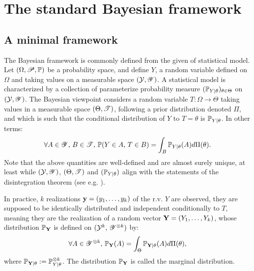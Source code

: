 


\section{The standard Bayesian framework}

\subsection{A minimal framework}

The Bayesian framework is commonly defined from the given of statistical model.
Let $(\Omega,\mathscr{P},\mathbb{P})$ be a probability space, and define $Y$, a random variable defined on $\Omega$ and taking values on a measurable space $(\mathcal{Y},\mathscr{Y})$.
A statistical model is characterized by a collection of parameterize probability measure $(\mathbb{P}_{Y|\theta})_{\theta\in\Theta}$ on $(\mathcal{Y},\mathscr{Y})$.
The Bayesian viewpoint considers a random variable $T:\Omega\to\Theta$ taking values in a measurable space $(\Theta,\mathscr{T})$, following a prior distribution denoted $\Pi$, and which is such that the conditional distribution of $Y$ to $T=\theta$ is $\mathbb{P}_{Y|\theta}$. In other terms:
    \begin{equation}
        \forall A\in\mathscr{Y},\,B\in\mathscr{T},\, \mathbb{P}(Y\in A,\, T\in B) = \int_B \mathbb{P}_{Y|\theta}(A) d\Pi(\theta).
    \end{equation}
Note that the above quantities are well-defined and are almost surely unique, at least while $(\mathcal{Y},\mathscr{Y})$, $(\Theta,\mathscr{T})$ and $(\mathbb{P}_{Y|\theta})$ align with the statements of the disintegration theorem (see e.g. \cite{chang_conditioning_1997}).

In practice, $k$ realizations $\mathbf{y}= (y_1,\dots,y_k)$ of the r.v. $Y$ are observed, they are supposed to be identically distributed and independent conditionally to $T$, meaning they are the realization of a random vector $\mathbf{Y} = (Y_1,\dots,Y_k)$, whose distribution $\mathbb{P}_{\mathbf{Y}}$ is defined on $(\mathcal{Y}^k,\,\mathscr{Y}^{\otimes k})$ by:
\begin{equation}
    \forall A\in\mathscr{Y}^{\otimes k},\, \mathbb{P}_{\mathbf{Y}}(A) = \int_\Theta \mathbb{P}_{\mathbf{Y}|\theta}(A)d\Pi(\theta),
\end{equation}
where $\mathbb{P}_{\mathbf{Y}|\theta}:=\mathbb{P}_{Y|\theta}^{\otimes k}$. The distribution $\mathbb{P}_{\mathbf{Y}}$ is called the marginal distribution.

